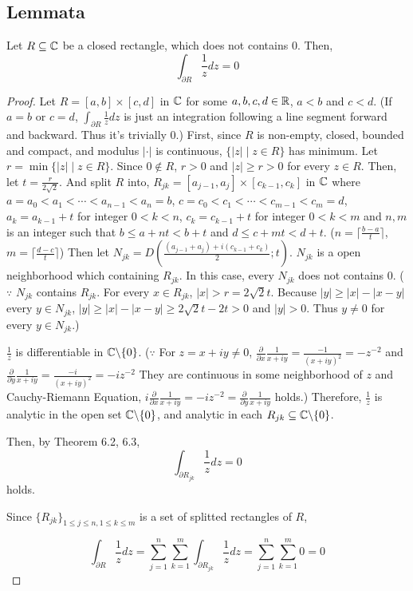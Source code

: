 \subsection*{Lemmata}
  \begin{lemma}\label{lem-9-rect}
    Let \(R \subseteq \mathbb{C}\) be a closed rectangle, which does not contains \(0\). Then,
    \[\int_{\partial R} \frac{1}{z} dz = 0\]
  \end{lemma}
  \begin{proof}
    Let \(R = [a, b] \times [c, d]\) in \(\mathbb{C}\) for some \(a, b, c, d \in \mathbb{R}\), \(a < b\) and \(c < d\).
    (If \(a = b\) or \(c = d\), \(\int_{\partial R} \frac{1}{z} dz\) is just an integration following a line segment forward and backward. Thus it's trivially 0.)
    First, since \(R\) is non-empty, closed, bounded and compact, and modulus \(|\cdot|\) is continuous, \(\{|z| \mid z \in R\}\) has minimum. Let \(r = \min \{|z| \mid z \in R\}\).
    Since \(0 \not\in R\), \(r > 0\) and \(|z| \ge r > 0\) for every \(z \in R\).
    Then, let \(t = \frac{r}{2\sqrt{2}}\).
    And split \(R\) into,
    \(R_{jk} = [a_{j - 1}, a_{j}] \times [c_{k - 1}, c_k]\) in \(\mathbb{C}\)
    where \(a = a_0 < a_1 < \cdots < a_{n - 1} < a_n = b\), \(c = c_0 < c_1 < \cdots < c_{m - 1} < c_m = d\), \(a_{k} = a_{k - 1} + t\) for integer \(0 < k < n\), \(c_{k} = c_{k - 1} + t\) for integer \(0 < k < m\) and \(n, m\) is an integer such that \(b \le a + nt < b + t\) and \(d \le c + mt < d + t\).
    (\(n = \lceil \frac{b - a}{t} \rceil\), \(m = \lceil \frac{d - c}{t} \rceil\))
    Then let \(N_{jk} = D(\frac{(a_{j - 1} + a_{j}) + i(c_{k - 1} + c_{k})}{2}; t)\).
    \(N_{jk}\) is a open neighborhood which containing \(R_{jk}\).
    In this case, every \(N_{jk}\) does not contains \(0\).
    (\(\because\) \(N_{jk}\) contains \(R_{jk}\). For every \(x \in R_{jk}\), \(|x| > r = 2\sqrt{2}t\). Because \(|y| \ge |x| - |x - y|\) every \(y \in N_{jk}\), \(|y| \ge |x| - |x - y| \ge 2\sqrt{2}t - 2t > 0\) and \(|y| > 0\). Thus \(y \neq 0\) for every \(y \in N_{jk}\).)

    \(\frac{1}{z}\) is differentiable in \(\bbC \bs \{0\}\).
    (\(\because\) For \(z = x + iy \neq 0\),
    \(\frac{\partial}{\partial x} \frac{1}{x + iy} = \frac{-1}{(x + iy)^2} = -z^{-2}\)
    and \(\frac{\partial}{\partial y} \frac{1}{x + iy} = \frac{-i}{(x + iy)^2} = -iz^{-2}\)
    They are continuous in some neighborhood of \(z\) and
    Cauchy-Riemann Equation, \(i\frac{\partial}{\partial x} \frac{1}{x + iy} = -iz^{-2} = \frac{\partial}{\partial y} \frac{1}{x + iy}\) holds.)
    Therefore, \(\frac{1}{z}\) is analytic in the open set \(\bbC \bs \{0\}\), and analytic in each \(R_{jk} \subseteq \bbC \bs \{0\}\).

    Then, by Theorem 6.2, 6.3,
    \[\int_{\partial R_{jk}} \frac{1}{z} dz = 0\]
    holds.

    Since \(\{R_{jk}\}_{1 \le j \le n, 1 \le k \le m}\) is a set of splitted rectangles of \(R\),

    \[\int_{\partial R} \frac{1}{z} dz = \sum_{j=1}^{n} \sum_{k=1}^{m} \int_{\partial R_{jk}} \frac{1}{z} dz = \sum_{j=1}^{n} \sum_{k=1}^{m} 0 = 0\]
  \end{proof}
